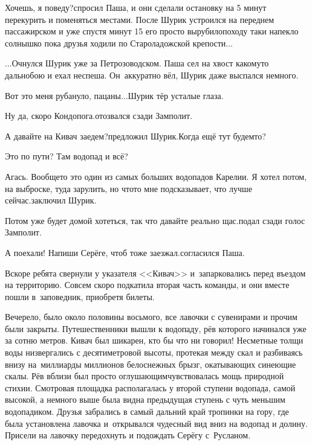 \diagdash Хочешь, я поведу?\mdash спросил Паша, и они сделали остановку на 5 минут перекурить и поменяться местами. После Шурик устроился на переднем пассажирском и уже спустя минут 15 его просто вырубило\mdash походу таки напекло солнышко пока друзья ходили по Староладожской крепости$\ldots$


$\ldots$Очнулся Шурик уже за Петрозоводском. Паша сел на хвост какому\sdash то дальнобою и ехал неспеша. Он~аккуратно вёл, Шурик даже выспался немного.

\diagdash Вот это меня рубануло, пацаны$\ldots$\mdash Шурик тёр усталые глаза.

\diagdash Ну да, скоро Кондопога.\mdash отозвался сзади Замполит.

\diagdash А давайте на Кивач заедем?\mdash предложил Шурик.\mdash Когда ещё тут будем\sdash то?

\diagdash Это по пути? Там водопад и всё?

\diagdash Агась. Вообще\sdash то это один из самых больших водопадов Карелии. Я хотел потом, на выброске, туда зарулить, но что\sdash то мне подсказывает, что лучше сейчас.\mdash заключил Шурик.

\diagdash Потом уже будет домой хотеться, так что давайте реально щас.\mdash подал сзади голос Замполит.

\diagdash А поехали! Напиши Серёге, чтоб тоже заезжал.\mdash согласился Паша.

Вскоре ребята свернули у указателя <<Кивач>> и~запарковались перед въездом на территорию. Совсем скоро подкатила вторая часть команды, и они вместе пошли в~заповедник, приобретя билеты.

Вечерело, было около половины восьмого, все лавочки с сувенирами и прочим были закрыты. Путешественники вышли к водопаду, рёв которого начинался уже за сотню метров. Кивач был шикарен, кто бы что ни говорил! Несметные толщи воды низвергались с десятиметровой высоты, протекая между скал и разбиваясь внизу на~миллиарды миллионов белоснежных брызг, окатывающих синеющие скалы. Рёв вблизи был просто оглушающим\mdash чувствовалась мощь природной стихии. Смотровая площадка располагалась у второй ступени водопада, самой высокой, а немного выше была видна предыдущая ступень с чуть меньшим водопадиком. Друзья забрались в самый дальний край тропинки на гору, где была установлена лавочка и~открывался чудесный вид вниз на водопад и долину. Присели на лавочку передохнуть и подождать Серёгу с~Русланом. 

